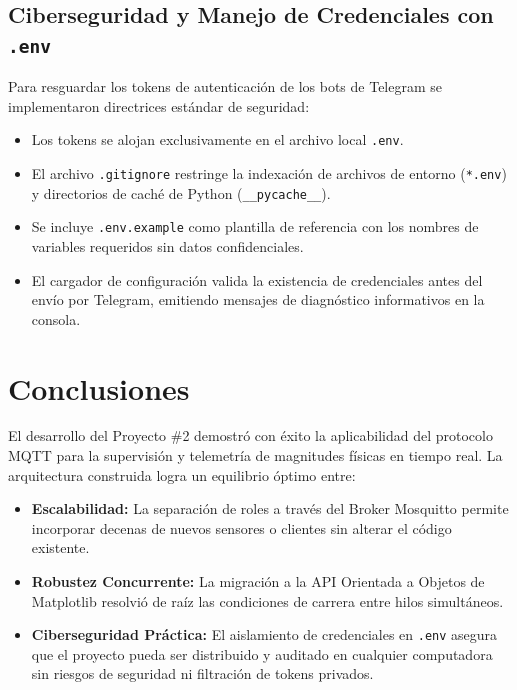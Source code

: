 \documentclass[12pt,letterpaper]{article}
\begin{document}
\subsection{Ciberseguridad y Manejo de Credenciales con \texttt{.env}}
Para resguardar los tokens de autenticación de los bots de Telegram se implementaron directrices estándar de seguridad:
\begin{itemize}
    \item Los tokens se alojan exclusivamente en el archivo local \texttt{.env}.
    \item El archivo \texttt{.gitignore} restringe la indexación de archivos de entorno (\texttt{*.env}) y directorios de caché de Python (\texttt{\_\_pycache\_\_}).
    \item Se incluye \texttt{.env.example} como plantilla de referencia con los nombres de variables requeridos sin datos confidenciales.
    \item El cargador de configuración valida la existencia de credenciales antes del envío por Telegram, emitiendo mensajes de diagnóstico informativos en la consola.
\end{itemize}

\section{Conclusiones}

El desarrollo del Proyecto \#2 demostró con éxito la aplicabilidad del protocolo MQTT para la supervisión y telemetría de magnitudes físicas en tiempo real. La arquitectura construida logra un equilibrio óptimo entre:

\begin{itemize}
    \item \textbf{Escalabilidad:} La separación de roles a través del Broker Mosquitto permite incorporar decenas de nuevos sensores o clientes sin alterar el código existente.
    \item \textbf{Robustez Concurrente:} La migración a la API Orientada a Objetos de Matplotlib resolvió de raíz las condiciones de carrera entre hilos simultáneos.
    \item \textbf{Ciberseguridad Práctica:} El aislamiento de credenciales en \texttt{.env} asegura que el proyecto pueda ser distribuido y auditado en cualquier computadora sin riesgos de seguridad ni filtración de tokens privados.
\end{itemize}
\end{document}
